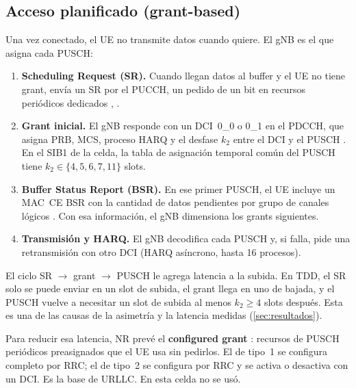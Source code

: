 \subsection{Acceso planificado (grant-based)}\label{sec:grant}
Una vez conectado, el UE no transmite datos cuando quiere. El gNB es el que asigna cada PUSCH:
\begin{enumerate}
  \item \textbf{Scheduling Request (SR).} Cuando llegan datos al buffer y el UE no tiene grant, envía un SR por el PUCCH, un pedido de un bit en recursos periódicos dedicados \cite[§5.4.4]{ts38321}, \cite[§9.2.4]{ts38213}.
  \item \textbf{Grant inicial.} El gNB responde con un DCI~0\_0 o 0\_1 en el PDCCH, que asigna PRB, MCS, proceso HARQ y el desfase $k_2$ entre el DCI y el PUSCH \cite[§6.1.2.1]{ts38214}. En el SIB1 de la celda, la tabla de asignación temporal común del PUSCH tiene $k_2\in\{4,5,6,7,11\}$ slots.
  \item \textbf{Buffer Status Report (BSR).} En ese primer PUSCH, el UE incluye un MAC~CE BSR con la cantidad de datos pendientes por grupo de canales lógicos \cite[§5.4.5]{ts38321}. Con esa información, el gNB dimensiona los grants siguientes.
  \item \textbf{Transmisión y HARQ.} El gNB decodifica cada PUSCH y, si falla, pide una retransmisión con otro DCI (HARQ asíncrono, hasta 16 procesos).
\end{enumerate}
El ciclo SR $\to$ grant $\to$ PUSCH le agrega latencia a la subida. En TDD, el SR solo se puede enviar en un slot de subida, el grant llega en uno de bajada, y el PUSCH vuelve a necesitar un slot de subida al menos $k_2\ge 4$ slots después. Esta es una de las causas de la asimetría y la latencia medidas (\cref{sec:resultados}).

Para reducir esa latencia, NR prevé el \textbf{configured grant} \cite[§5.8.2]{ts38321}: recursos de PUSCH periódicos preasignados que el UE usa sin pedirlos. El de tipo~1 se configura completo por RRC; el de tipo~2 se configura por RRC y se activa o desactiva con un DCI. Es la base de URLLC. En esta celda no se usó.

